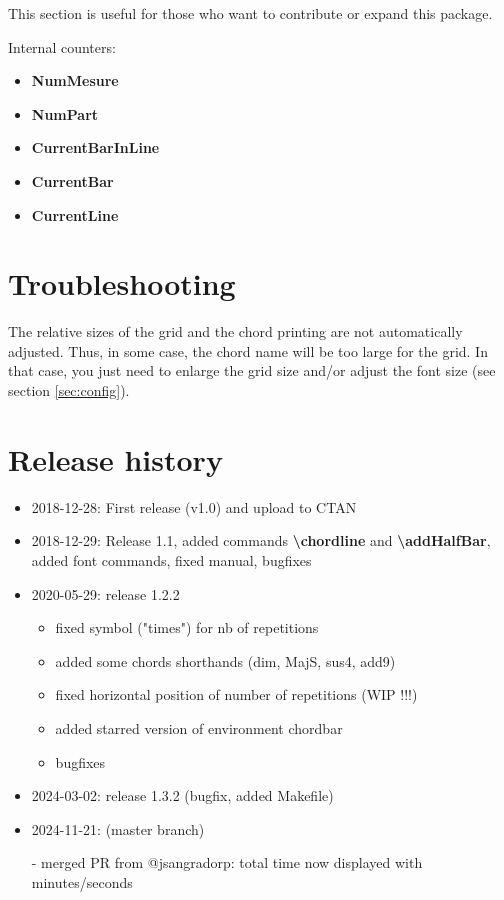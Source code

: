 \documentclass[11pt]{article}
\newcommand{\btt}{\bfseries \ttfamily }
\newcommand{\tbs}{\textbackslash{}}
\begin{document}
This section is useful for those who want to contribute or expand this package.

Internal counters:

\begin{itemize}
\item {\btt NumMesure}
\item {\btt NumPart}
\item {\btt CurrentBarInLine}
\item {\btt CurrentBar}
\item {\btt CurrentLine}
\end{itemize}

\section{Troubleshooting}

The relative sizes of the grid and the chord printing are not automatically adjusted.
Thus, in some case, the chord name will be too large for the grid.
In that case, you just need to enlarge the grid size and/or adjust the font size (see section \ref {sec:config}).

\section{Release history}

\begin{itemize}
\item 2018-12-28: First release (v1.0) and upload to CTAN

\item 2018-12-29: Release 1.1, added commands {\btt \tbs chordline} and {\btt \tbs addHalfBar}, added font commands, fixed manual, bugfixes

\item 2020-05-29: release 1.2.2
\begin{itemize}
\item fixed symbol ("times") for nb of repetitions
\item added some chords shorthands (dim, MajS, sus4, add9)
\item fixed horizontal position of number of repetitions (WIP !!!)
\item added starred version of environment chordbar
\item bugfixes
\end{itemize}

\item 2024-03-02: release 1.3.2 (bugfix, added Makefile)

\item 2024-11-21: (master branch)

 - merged PR from @jsangradorp: total time now displayed with minutes/seconds
\end{itemize}
\end{document}
